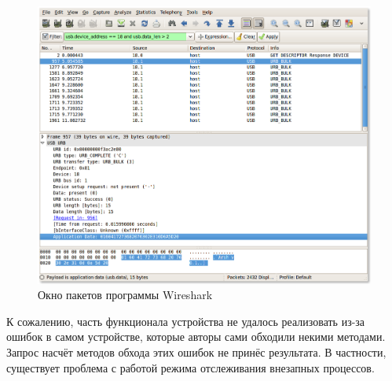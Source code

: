\documentclass[a4paper,12pt]{report}
\numberwithin{equation}{section}
\begin{document}
\begin{figure}[h!]
\centering
\includegraphics[width=\textwidth]{wireshark}
\caption{Окно пакетов программы Wireshark}
\label{wireshark}
\end{figure}

К сожалению, часть функционала устройства не удалось реализовать из-за ошибок в
самом устройстве, которые авторы сами обходили некими методами. Запрос насчёт
методов обхода этих ошибок не принёс результата. В частности, существует
проблема с работой режима отслеживания внезапных процессов.
\end{document}
